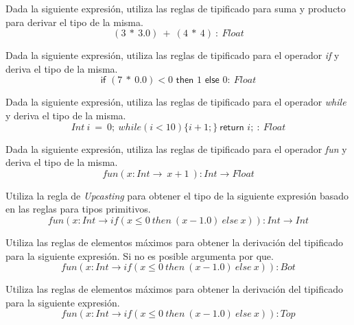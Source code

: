     \bigskip

    \begin{exercise}
        Dada la siguiente expresión, utiliza las reglas de tipificado para suma y producto para derivar el tipo de la misma.
        $$ (3\ *\ 3.0)\ +\ (4\ *\ 4)\ : \ \textit{Float}$$
    \end{exercise}
    \bigskip

    \begin{exercise}
        Dada la siguiente expresión, utiliza las reglas de tipificado para el operador \textit{if} y deriva el tipo de la misma.
        $$\textsf{if } (7\ *\ 0.0) < 0 \textsf{ then } 1 \textsf{ else } 0 : \ \textit{Float}$$
    \end{exercise}
    \bigskip

    \begin{exercise}
        Dada la siguiente expresión, utiliza las reglas de tipificado para el operador \textit{while} y deriva el tipo de la misma.
        $$ Int\ i\ =\ 0;\ while(i < 10)\{i + 1;\}\ \textsf{return } i;\ :\ Float$$
    \end{exercise}
    \bigskip

    \begin{exercise}
        Dada la siguiente expresión, utiliza las reglas de tipificado para el operador \textit{fun} y deriva el tipo de la misma.
        $$ fun(x:\textit{Int} \rightarrow \ x + 1\ ) : \textit{Int}  \rightarrow \textit{Float} $$
    \end{exercise}

    \bigskip

    \begin{exercise}
        Utiliza la regla de \textit{Upcasting} para obtener el tipo de la siguiente expresión basado en las reglas para tipos primitivos.
        $$ fun(x:\textit{Int} \rightarrow if( x \leq 0\ then\ (x - 1.0) \ else\ x  ) ) : \textit{Int}  \rightarrow \textit{Int} $$
    \end{exercise}

    \bigskip

    \begin{exercise}
        Utiliza las reglas de elementos máximos para obtener la derivación del tipificado para la siguiente expresión.
        Si no es posible argumenta por que.
        $$ fun(x:\textit{Int} \rightarrow if( x \leq 0\ then\ (x - 1.0) \ else\ x  ) ) : \textit{Bot} $$
    \end{exercise}
	
	\bigskip

    \begin{exercise}
        Utiliza las reglas de elementos máximos para obtener la derivación del tipificado para la siguiente expresión.
        $$ fun(x:\textit{Int} \rightarrow if( x \leq 0\ then\ (x - 1.0) \ else\ x  ) ) : \textit{Top} $$
    \end{exercise}
 